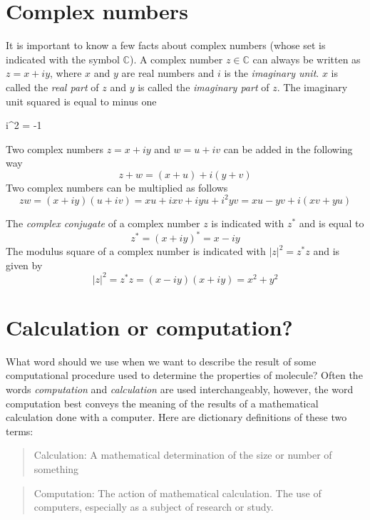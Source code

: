 \documentclass[../Main/notes.tex]{subfiles}
\begin{document}
\begin{aside}
\section*{Complex numbers}
It is important to know a few facts about complex numbers (whose set is indicated with the symbol $\mathbb{C}$). A complex number $z \in \mathbb{C}$ can always be written as $z = x + iy$, where $x$ and $y$ are real numbers and $i$ is the \emph{imaginary unit}.
$x$ is called the \emph{real part} of $z$ and $y$ is called the \emph{imaginary part} of $z$. 
The imaginary unit squared is equal to minus one
\begin{iequation}
i^2 = -1
\end{iequation}
Two complex numbers $z = x + iy$ and $w = u + i v$ can be added in the following way
\begin{equation*}
z + w =  (x + u) + i (y + v)
\end{equation*}
Two complex numbers can be multiplied as follows
\begin{equation*}
z w = (x + iy)(u + iv) = xu + ixv + iyu + i^2 yv = xu - yv + i (xv + yu)
\end{equation*}

The \emph{complex conjugate} of a complex number $z$ is indicated with $z^*$ and is equal to
\begin{equation*}
z^* = (x + iy)^* = x - iy
\end{equation*}
The modulus square of a complex number is indicated with $|z|^2 = z^* z$ and is given by
\begin{equation*}
|z|^2 = z^* z = (x - iy)(x + iy) = x^2 + y^2
\end{equation*}

\section*{Calculation or computation?}
What word should we use when we want to describe the result of some computational procedure used to determine the properties of molecule?
Often the words \emph{computation} and \emph{calculation} are used interchangeably, however, the word computation best conveys the meaning of the results of a mathematical calculation done with a computer. Here are dictionary definitions of these two terms:
\begin{quote}
Calculation: A mathematical determination of the size or number of something
\end{quote}
\begin{quote}
Computation: The action of mathematical calculation. The use of computers, especially as a subject of research or study.
\end{quote}
\end{aside}
\end{document}
